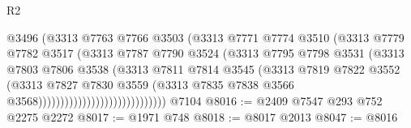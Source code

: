 \begin{lexlean}{R2}
\begin{coremodule}
                                          @3496
                                          (@3313
                                            @7763
                                            @7766
                                            @3503
                                            (@3313
                                              @7771
                                              @7774
                                              @3510
                                              (@3313
                                                @7779
                                                @7782
                                                @3517
                                                (@3313
                                                  @7787
                                                  @7790
                                                  @3524
                                                  (@3313
                                                    @7795
                                                    @7798
                                                    @3531
                                                    (@3313
                                                      @7803
                                                      @7806
                                                      @3538
                                                      (@3313
                                                        @7811
                                                        @7814
                                                        @3545
                                                        (@3313
                                                          @7819
                                                          @7822
                                                          @3552
                                                          (@3313
                                                            @7827
                                                            @7830
                                                            @3559
                                                            (@3313
                                                              @7835
                                                              @7838
                                                              @3566
                                                              @3568)))))))))))))))))))))))))))))
    @7104
@8016 := @2409 @7547 @293 @752 @2275 @2272
@8017 := @1971 @748
@8018 := @8017 @2013
@8047 := @8016

\end{coremodule}
\end{lexlean}
